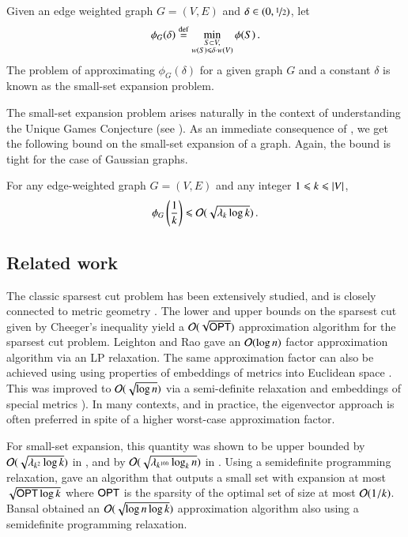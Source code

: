 \documentclass[11pt]{article}
\begin{document}
\begin{problem} Given an edge weighted graph
	$G=(V,E)$ and $\delta \in (0,\nicefrac{1}{2})$, let 
	$$ \phi_G(\delta) \stackrel{\textup{def}}{=} \min_{\substack{S \subset V,\\ w(S) \leqslant \delta
	\cdot w(V)}}
	\phi(S) \,. $$
	The problem of approximating $\phi_G(\delta)$ for a given
	graph $G$ and  a constant $\delta$ is known as the small-set
	expansion problem.
\end{problem}

 The small-set expansion problem arises naturally in the context of
 understanding the Unique Games Conjecture (see \cite{rs10,abs10}).
As an immediate consequence of , we get the
following bound on the small-set expansion of a graph. Again, the
bound is tight for the case of Gaussian graphs.
\begin{corollary}\label{cor:small-set}
For any edge-weighted graph $G=(V,E)$ and any integer $1 \leqslant k \leqslant
\left\lvert V\right\rvert$, 
$$ \phi_G\left(\frac{1}{k}\right) \leqslant \mathcal O(\sqrt{\lambda_k \log k})  \,. $$ 
\end{corollary}




\subsection{Related work}
\label{sec:related}

The classic sparsest cut problem has been extensively studied, and is
closely connected to metric geometry \cite{llr95, ar98}.
%
The lower and upper bounds on the sparsest cut given by Cheeger's
inequality yield a $\mathcal{O}(\sqrt{{\sf OPT}})$ approximation algorithm for
the sparsest cut problem. Leighton and Rao \cite{lr99} gave an
$\mathcal{O}(\log n)$ factor approximation algorithm via an LP relaxation.
%
The same approximation factor can also be achieved using using
properties of embeddings of metrics into Euclidean space \cite{llr95, ar98}. 
%
This was improved to $\mathcal{O}(\sqrt{\log n})$ via a semi-definite relaxation and embeddings of special metrics \cite{arv04}).
%
In many contexts, and in practice, the eigenvector approach is often preferred in spite of a higher worst-case approximation factor.



For small-set expansion, this quantity was shown to be upper bounded by $\mathcal{O}(\sqrt{\lambda_{k^2} \log
k})$ in \cite{lrtv11}, and by $\mathcal{O}(\sqrt{\lambda_{k^{100}} \log_k n
})$ in \cite{abs10}.
%
Using a semidefinite programming relaxation, \cite{rst10} gave an
algorithm that outputs a small set with expansion at most
$\sqrt{{\sf OPT}\log k}$ where ${\sf OPT}$ is the sparsity of the optimal set of
size at most $\mathcal{O}(1/k)$.  Bansal \etal \cite{bfk11} obtained an
$\mathcal{O}(\sqrt{\log n \log k})$ approximation algorithm also using a semidefinite programming relaxation.
\end{document}
